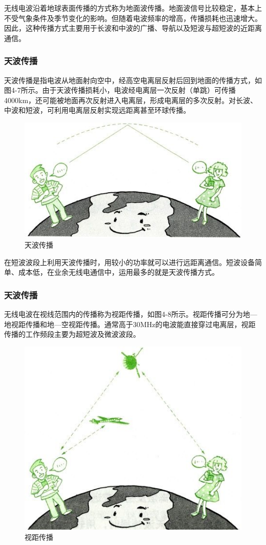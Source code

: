 \documentclass[12pt,UTF8]{ctexbook}
\begin{document}
无线电波沿着地球表面传播的方式称为地面波传播。地面波信号比较稳定，基本上不受气象条件及季节变化的影响。但随着电波频率的增高，传播损耗也迅速增大。因此，这种传播方式主要用于长波和中波的广播、导航以及短波与超短波的近距离通信。

\subsubsection{天波传播}

天波传播是指电波从地面射向空中，经高空电离层反射后回到地面的传播方式，如图4-7所示。由于天波传播损耗小，电波经电离层一次反射（单跳）可传播4000km，还可能被地面再次反射进入电离层，形成电离层的多次反射。对长波、中波和短波，可利用电离层反射实现远距离甚至环球传播。

\begin{figure}[htbp]
	\centering
	\includegraphics[width=0.7\linewidth]{50}
	\caption{天波传播}
	\label{fig:1}
\end{figure}

在短波波段上利用天波传播时，用较小的功率就可以进行远距离通信。短波设备简单、成本低，在业余无线电通信中，运用最多的就是天波传播方式。

\subsubsection{天波传播}

无线电波在视线范围内的传播称为视距传播，如图4-8所示。视距传播可分为地—地视距传播和地—空视距传播。通常高于30MHz的电波能直接穿过电离层，视距传播的工作频段主要为超短波及微波波段。

\begin{figure}[htbp]
	\centering
	\includegraphics[width=0.7\linewidth]{51}
	\caption{视距传播}
	\label{fig:1}
\end{figure}
\end{document}
